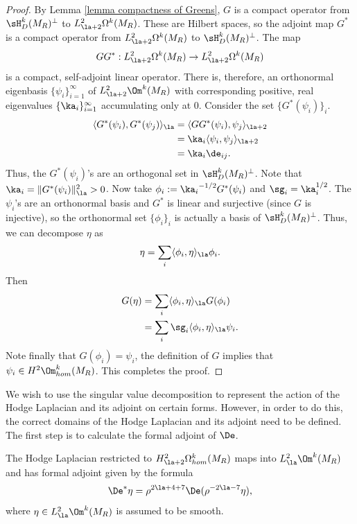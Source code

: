 \documentclass[hidelinks, 12pt, oneside, reqno]{amsart}
\begin{document}
\begin{proof}
    By Lemma \ref{lemma compactness of Greens}, $G$ is a compact operator from $\sH^k_D(M_R)^\perp$ to $L^{2}_{\la +2} \Omega^k (M_R)$. These are Hilbert spaces, so the adjoint map $G^*$ is a compact operator from $L^{2}_{\la +2} \Omega^k (M_R)$ to $\sH^k_D(M_R)^\perp$. The map 
    \[
    GG^* : L^2_{\la+2}\Omega^k(M_R) \rightarrow L^2_{\la+2}\Omega^k(M_R)
    \]
    is a compact, self-adjoint linear operator. There is, therefore, an orthonormal eigenbasis $\{\psi_i\}_{i = 1}^\infty$ of $L^2_{\la +2} \Om^k(M_R)$ with corresponding positive, real eigenvalues $\{\ka_i\}_{i=1}^\infty$ accumulating only at $0$. Consider the set $\{G^*(\psi_i)\}_i$. 
    \begin{align*}
        \langle G^*(\psi_i), G^*(\psi_j) \rangle_{\la}
        &= \langle GG^*(\psi_i), \psi_j \rangle_{\la + 2} \\
        &= \ka_i \langle \psi_i, \psi_j \rangle_{\la + 2} \\
        &= \ka_i \de_{ij}.
    \end{align*}
    Thus, the $G^*(\psi_i)$'s are an orthogonal set in $\sH^k_D(M_R)^\perp$. Note that $\ka_i = \|G^*(\psi_i)\|_\la^2 >0$. Now take $\phi_i := {\ka_i}^{-1/2}G^*(\psi_i)$ and $\sg_i = \ka_i^{1/2}$. The $\psi_i$'s are an orthonormal basis and $G^*$ is linear and surjective (since $G$ is injective), so the orthonormal set $\{\phi_i\}_i$ is actually a basis of $\sH^k_D(M_R)^\perp$. Thus, we can decompose $\eta$ as
    \[
    \eta = \sum_i \langle \phi_i, \eta \rangle_{\la} \phi_i.
    \]
    Then
    \begin{align*}
    G(\eta) &= \sum_i \langle \phi_i, \eta \rangle_{\la} G(\phi_i) \\
    &= \sum_i \sg_i \langle \phi_i, \eta \rangle_{\la} \psi_i.
    \end{align*}
    Note finally that $G(\phi_i) = \psi_i$, the definition of $G$ implies that $\psi_i \in H^2\Om^k_{hom}(M_R)$. This completes the proof.
\end{proof}

We wish to use the singular value decomposition to represent the action of the Hodge Laplacian and its adjoint on certain forms. However, in order to do this, the correct domains of the Hodge Laplacian and its adjoint need to be defined. The first step is to calculate the formal adjoint of $\De$.

\begin{prop}\label{proposition formal adjoint of laplacian}
    The Hodge Laplacian restricted to $H^2_{\la +2} \Omega^k_{hom}(M_R)$ maps into $ L^2_{\la} \Om^k(M_R)$ and has formal adjoint given by the formula
    \[
    \De^*\eta = \rho^{2\la + 4 + 7}\De (\rho^{-2\la -7} \eta),
    \]
    where $\eta \in L^2_{\la} \Om^k(M_R)$ is assumed to be smooth.
\end{prop}
\end{document}
